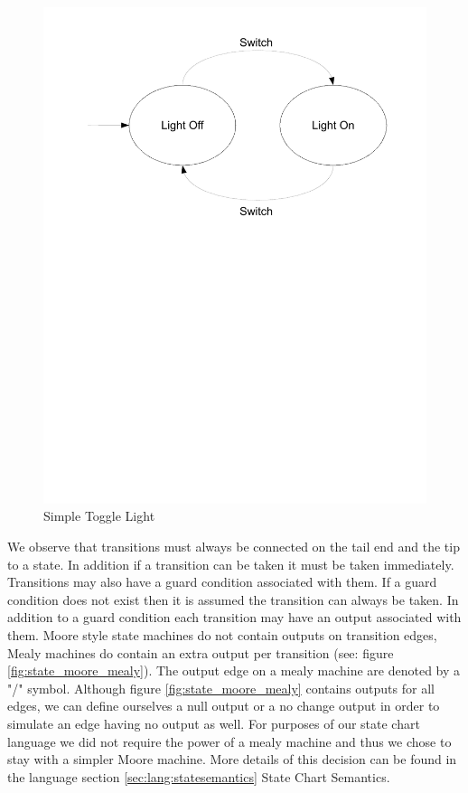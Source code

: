 \begin{figure}[htp]
    \centering
    \includegraphics[trim= 10mm 150mm 10mm 10mm, clip, width=\imgmedium]{./images/state_blink_light.pdf}
    \caption{Simple Toggle Light}
    \label{fig:state_blink_light}
\end{figure}

We observe that transitions must always be connected on the tail end and the tip to a state. In addition if a transition can be taken it must be taken immediately. Transitions may also have a guard condition associated with them. If a guard condition does not exist then it is assumed the transition can always be taken. In addition to a guard condition each transition may have an output associated with them. Moore style state machines do not contain outputs on transition edges, Mealy machines do contain an extra output per transition (see: figure \ref{fig:state_moore_mealy}). The output edge on a mealy machine are denoted by a "/" symbol. Although figure \ref{fig:state_moore_mealy} contains outputs for all edges, we can define ourselves a null output or a no change output in order to simulate an edge having no output as well. For purposes of our state chart language we did not require the power of a mealy machine and thus we chose to stay with a simpler Moore machine. More details of this decision can be found in the language section \ref{sec:lang:statesemantics} State Chart Semantics.

